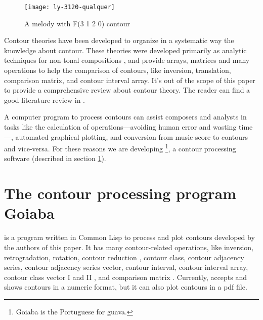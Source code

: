 \begin{figure}[h!]
  \centering
  \texttt{[image: ly-3120-qualquer]}
  \caption{A melody with F(3 1 2 0) contour}
  \label{fig:ly-3120}
\end{figure}

Contour theories
\cite{friedmann85:methodology,friedmann87:response,morris87:composition,morris93:directions,marvin.ea87:relating,marvin88:generalized,marvin.ea95:generalization,polansky.ea92:possible,quinn97:fuzzy,clifford95:contour,beard03:contour}
have been developed to organize in a systematic way the knowledge
about contour. These theories were developed primarily as analytic
techniques for non-tonal compositions \cite{beard03:contour}, and
provide arrays, matrices and many operations to help the comparison of
contours, like inversion, translation, comparison matrix, and contour
interval array. It's out of the scope of this paper to provide a
comprehensive review about contour theory. The reader can find a good
literature review in \cite{beard03:contour}.

A computer program to process contours can assist composers and
analysts in tasks like the calculation of operations---avoiding human
error and wasting time---, automated graphical plotting, and
conversion from music score to contours and vice-versa. For these
reasons we are developing \goiaba{}\footnote{Goiaba is the Portuguese
  for guava.}, a contour processing software (described in section
\ref{sec:goiaba}).

\section{The contour processing program Goiaba}
\label{sec:goiaba}

\goiaba{} is a program written in Common Lisp
\cite{graham94:lisp,team07:sbcl} to process and plot contours
developed by the authors of this paper. It has many contour-related
operations, like inversion, retrogradation, rotation, contour
reduction \cite{adams76:melodic}, contour class, contour adjacency
series, contour adjacency series vector, contour interval, contour
interval array, contour class vector I and II
\cite{friedmann85:methodology}, and comparison matrix
\cite{morris93:directions}. Currently, \goiaba{} accepts and shows
contours in a numeric format, but it can also plot contours in a pdf
file.

